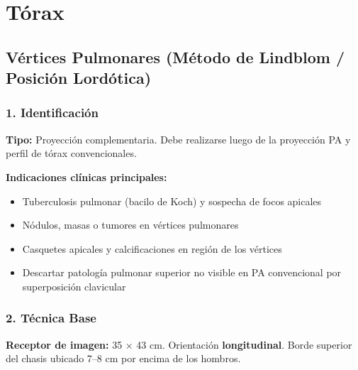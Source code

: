 	
	
		
		\section{Tórax}
		
		\subsection{Vértices Pulmonares (Método de Lindblom / Posición Lordótica)}
		
		\subsubsection*{1. Identificación}
		
		\textbf{Tipo:} Proyección complementaria. Debe realizarse luego de la proyección PA y perfil de tórax convencionales.
		
		\textbf{Indicaciones clínicas principales:}
		\begin{itemize}
			\item Tuberculosis pulmonar (bacilo de Koch) y sospecha de focos apicales
			\item Nódulos, masas o tumores en vértices pulmonares
			\item Casquetes apicales y calcificaciones en región de los vértices
			\item Descartar patología pulmonar superior no visible en PA convencional por superposición clavicular
		\end{itemize}
		
		\subsubsection*{2. Técnica Base}
		
		\textbf{Receptor de imagen:} 35 × 43 cm. Orientación \textbf{longitudinal}. Borde superior del chasis ubicado 7--8 cm por encima de los hombros.
		
